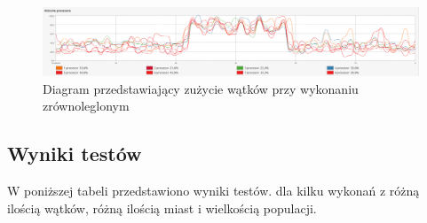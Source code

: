 \documentclass[10pt,a4paper]{article}
\begin{document}
\begin{figure}[H]
\includegraphics[scale=0.18]{zrzutParallel.png}
\centering
\caption{\label{diagramParallel}Diagram przedstawiający zużycie wątków przy wykonaniu zrównoleglonym}
\end{figure}

\subsection{Wyniki testów}
W poniższej tabeli przedstawiono wyniki testów. dla kilku wykonań z różną ilością wątków, różną ilością miast i wielkością populacji.


\end{document}
